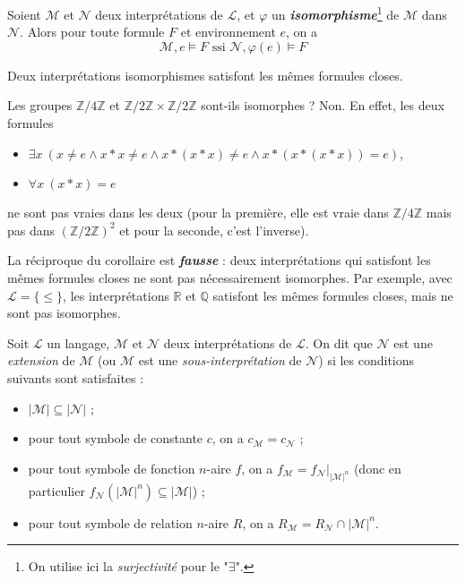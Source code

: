 \documentclass[./main]{subfiles}
\begin{document}
  \begin{lem}
    Soient $\mathcal{M}$ et $\mathcal{N}$ deux interprétations de $\mathcal{L}$, et $\varphi$ un \textit{\textbf{isomorphisme}}\footnote{On utilise ici la \textit{surjectivité} pour le "$\exists $".} de $\mathcal{M}$ dans $\mathcal{N}$. Alors pour toute formule $F$ et environnement $e$, on a \[
      \mathcal{M}, e \models F \text{ ssi } \mathcal{N}, \varphi(e) \models F
    \]
  \end{lem}

  \begin{crlr}
    Deux interprétations isomorphismes satisfont les mêmes formules closes.
  \end{crlr}

  \begin{exo}
    Les groupes $\mathds{Z} / 4 \mathds{Z}$ et $\mathds{Z} / 2 \mathds{Z} \times \mathds{Z} / 2 \mathds{Z}$ sont-ils isomorphes ?
    Non. En effet, les deux formules 
    \begin{itemize}
      \item $\exists x\: (x \neq e \land x * x \neq e \land x * (x * x) \neq e \land x * (x * (x * x)) = e)$,
      \item $\forall x \: (x*x) = e$
    \end{itemize}
    ne sont pas vraies dans les deux (pour la première, elle est vraie dans $\mathds{Z} / 4 \mathds{Z}$ mais pas dans $(\mathds{Z} / 2 \mathds{Z})^2$ et pour la seconde, c'est l'inverse).
  \end{exo}

  \begin{rmk}
    La réciproque du corollaire est \textit{\textbf{fausse}} : deux interprétations qui satisfont les mêmes formules closes ne sont pas nécessairement isomorphes.
    Par exemple, avec $\mathcal{L} = \{{\le}\}$, les interprétations $\mathds{R}$ et $\mathds{Q}$ satisfont les mêmes formules closes, mais ne sont pas isomorphes.
  \end{rmk}

  \begin{defn}
    Soit $\mathcal{L}$ un langage, $\mathcal{M}$ et $\mathcal{N}$ deux interprétations de $\mathcal{L}$.
    On dit que $\mathcal{N}$ est une \textit{extension} de $\mathcal{M}$ (ou $\mathcal{M}$ est une \textit{sous-interprétation} de $\mathcal{N}$) si les conditions suivants sont satisfaites :
    \begin{itemize}
      \item $|\mathcal{M}| \subseteq |\mathcal{N}|$ ;
      \item pour tout symbole de constante $c$, on a $c_{\mathcal{M}} = c_{\mathcal{N}}$ ;
      \item pour tout symbole de fonction $n$-aire $f$, on a $f_{\mathcal{M}} = f_{\mathcal{N}}\big|_{|\mathcal{M}|^n}$ (donc en particulier $f_{\mathcal{N}}(|\mathcal{M}|^n) \subseteq |\mathcal{M}|$) ;
      \item pour tout symbole de relation $n$-aire $R$, on a $R_{\mathcal{M}} = R_{\mathcal{N}} \cap |\mathcal{M}|^n$.
    \end{itemize}
  \end{defn}
\end{document}
